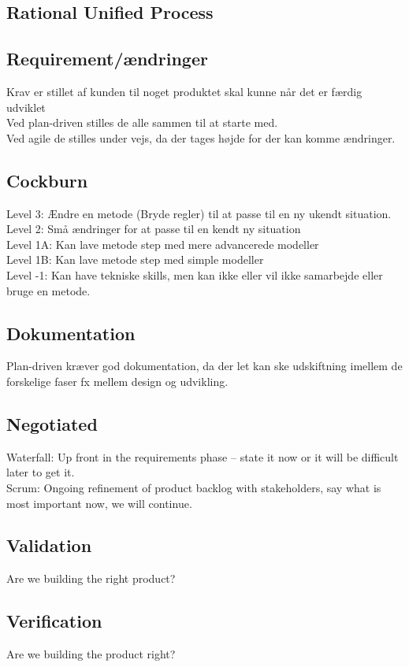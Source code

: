 \documentclass[11pt,a4paper]{article}
\begin{document}
\subsection{Rational Unified Process}
\subsection{Requirement/ændringer}
Krav er stillet af kunden til noget produktet skal kunne når det er færdig udviklet\\
Ved plan-driven stilles de alle sammen til at starte med.\\
Ved agile de stilles under vejs, da der tages højde for der kan komme ændringer.
\subsection{Cockburn}
Level 3: Ændre en metode (Bryde regler) til at passe til en ny ukendt situation.\\
Level 2: Små ændringer for at passe til en kendt ny situation\\
Level 1A: Kan lave metode step med mere advancerede modeller\\
Level 1B: Kan lave metode step med simple modeller\\
Level -1: Kan have tekniske skills, men kan ikke eller vil ikke samarbejde eller bruge en metode.
\subsection{Dokumentation}
Plan-driven kræver god dokumentation, da der let kan ske udskiftning imellem de forskelige faser fx mellem design og udvikling.
\subsection{Negotiated}
Waterfall: Up front in the requirements phase – state it now or it will be difficult later to get it.\\
Scrum: Ongoing refinement of product backlog with stakeholders, say what is most important now, we will continue.
\subsection{Validation}
Are we building the right product?
\subsection{Verification}
Are we building the product right?
\end{document}

